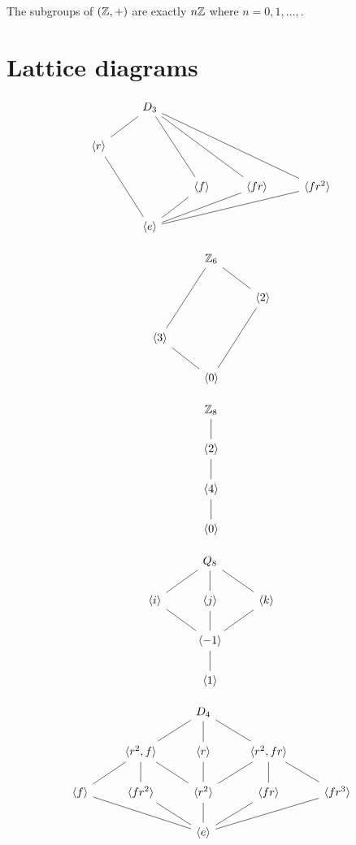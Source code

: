 \documentclass{ximera}
\begin{document}
\begin{corollary}
  The subgroups of $(\mathbb Z,+)$ are exactly $n\mathbb Z$ where $n = 0,1,\dots,$.
\end{corollary}


\section{Lattice diagrams}

\[
\begin{tikzcd}
       & D_3 \ar[rdd,-]\ar[rrdd,-]\ar[rrrdd,-]  \ar[ld,-] & & &      \\
 \<r\> \ar[rdd,-]       &       &  & &  \\
       &       &  \< f\> \ar[ld,-]   &  \< fr\> \ar[lld,-]       &  \< fr^2\> \ar[llld,-]        \\   
       & \<e\> & & &
\end{tikzcd}
\]

\[
\begin{tikzcd}
       & \Z_6 \ar[rd,-]  \ar[ldd,-] &       \\
       &       & \<2\> \ar[ldd,-]\\
\< 3\> \ar[rd,-]&       &       \\   
       & \<0\> &
\end{tikzcd}
\]

\[
\begin{tikzcd}
  \Z_8  \ar[d,-] \\
  \<2\> \ar[d,-] \\
  \<4\> \ar[d,-] \\   
  \<0\> 
\end{tikzcd}
\]


\[
\begin{tikzcd}
       & Q_8 \ar[rd,-] \ar[d,-] \ar[ld,-] &       \\
\<i\>  \ar[rd,-] & \<j\>  \ar[d,-]     & \<k\> \ar[ld,-]\\
&\< -1\> \ar[d,-]&        \\   
       & \<1\> &
\end{tikzcd}
\]


\[
\begin{tikzcd}
   &    & D_4 \ar[rd,-] \ar[d,-] \ar[ld,-] &       \\
&\<r^2,f\>  \ar[rd,-] \ar[d,-] \ar[ld,-]& \<r \>  \ar[d,-]     & \<r^2,fr\> \ar[ld,-] \ar[d,-] \ar[rd,-]\\
\<f\>\ar[rrd,-]& \<fr^2\> \ar[rd,-]&\< r^2\> \ar[d,-]  &   \<fr\> \ar[ld,-]& \<fr^3\>\ar[lld,-]     \\   
  &     & \<e\> &  &
\end{tikzcd}
\]
\end{document}
